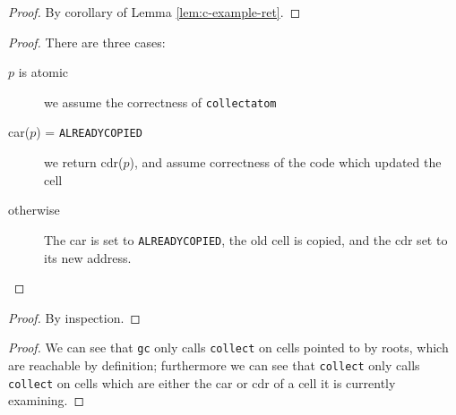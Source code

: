 \begin{lemma}
  \label{lem:c-example-duplication}
\end{lemma}

\begin{proof}
  By corollary of Lemma \ref{lem:c-example-ret}.
\end{proof}

\begin{lemma}
  \label{lem:c-example-ret}
\end{lemma}

\begin{proof}
  There are three cases:

  \begin{description}
  \item[$p$ is atomic] we assume the correctness of
    \texttt{collectatom}

  \item[car($p$) = \texttt{ALREADYCOPIED}] we return cdr($p$), and
    assume correctness of the code which updated the cell

  \item[otherwise] The car is set to \texttt{ALREADYCOPIED}, the old
    cell is copied, and the cdr set to its new address.
  \end{description}
\end{proof}

\begin{lemma}
  \label{lem:c-example-update}
\end{lemma}

\begin{proof}
  By inspection.
\end{proof}

\begin{lemma}
  \label{lem:c-example-unreach}
\end{lemma}

\begin{proof}
  We can see that \texttt{gc} only calls \texttt{collect} on
  cells pointed to by roots, which are reachable by definition;
  furthermore we can see that \texttt{collect} only calls
  \texttt{collect} on cells which are either the car or cdr of a cell
  it is currently examining.
\end{proof}

